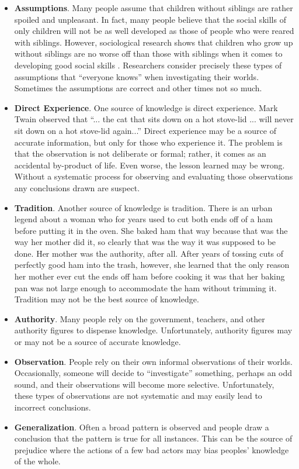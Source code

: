 \begin{itemize}
	\item \textbf{Assumptions}. Many people assume that children without siblings are rather spoiled and unpleasant. In fact, many people believe that the social skills of only children will not be as well developed as those of people who were reared with siblings. However, sociological research shows that children who grow up without siblings are no worse off than those with siblings when it comes to developing good social skills \cite{bobbitt2013number}. Researchers consider precisely these types of assumptions that ``everyone knows'' when investigating their worlds. Sometimes the assumptions are correct and other times not so much.
	
	\item \textbf{Direct Experience}. One source of knowledge is direct experience. Mark Twain observed that ``... the cat that sits down on a hot stove-lid ... will never sit down on a hot stove-lid again...'' \cite{twain2014following} Direct experience may be a source of accurate information, but only for those who experience it. The problem is that the observation is not deliberate or formal; rather, it comes as an accidental by-product of life. Even worse, the lesson learned may be wrong. Without a systematic process for observing and evaluating those observations any conclusions drawn are suspect.

	\item \textbf{Tradition}. Another source of knowledge is tradition. There is an urban legend about a woman who for years used to cut both ends off of a ham before putting it in the oven\cite{snopes2005grandma}. She baked ham that way because that was the way her mother did it, so clearly that was the way it was supposed to be done. Her mother was the authority, after all. After years of tossing cuts of perfectly good ham into the trash, however, she learned that the only reason her mother ever cut the ends off ham before cooking it was that her baking pan was not large enough to accommodate the ham without trimming it. Tradition may not be the best source of knowledge.
		
	\item \textbf{Authority}. Many people rely on the government, teachers, and other authority figures to dispense knowledge. Unfortunately, authority figures may or may not be a source of accurate knowledge.
	
	\item \textbf{Observation}. People rely on their own informal observations of their worlds. Occasionally, someone will decide to ``investigate'' something, perhaps an odd sound, and their observations will become more selective. Unfortunately, these types of observations are not systematic and may easily lead to incorrect conclusions.
	
	\item \textbf{Generalization}. Often a broad pattern is observed and people draw a conclusion that the pattern is true for all instances. This can be the source of prejudice where the actions of a few bad actors may bias peoples' knowledge of the whole.
	
\end{itemize} 

